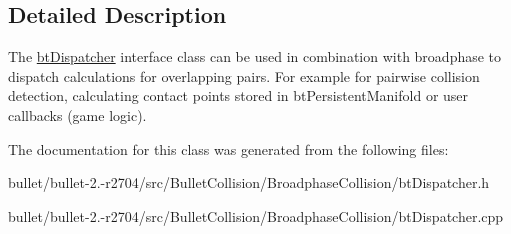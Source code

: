 \subsection{Detailed Description}
The \hyperlink{classbt_dispatcher}{bt\+Dispatcher} interface class can be used in combination with broadphase to dispatch calculations for overlapping pairs. For example for pairwise collision detection, calculating contact points stored in bt\+Persistent\+Manifold or user callbacks (game logic). 

The documentation for this class was generated from the following files\+:\begin{DoxyCompactItemize}
\item 
bullet/bullet-\/2.-\/r2704/src/\+Bullet\+Collision/\+Broadphase\+Collision/bt\+Dispatcher.\+h\item 
bullet/bullet-\/2.-\/r2704/src/\+Bullet\+Collision/\+Broadphase\+Collision/bt\+Dispatcher.\+cpp\end{DoxyCompactItemize}
